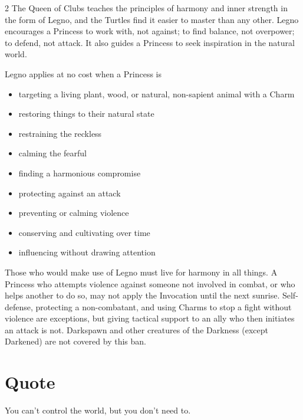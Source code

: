\begin{multicols}{2}
The Queen of Clubs teaches the principles of harmony and inner strength in the form of Legno, and the Turtles find it easier to master than any other. Legno encourages a Princess to work with, not against; to find balance, not overpower; to defend, not attack. It also guides a Princess to seek inspiration in the natural world.

Legno applies at no cost when a Princess is
\begin{itemize}
\item targeting a living plant, wood, or natural, non-sapient animal with a Charm
\item restoring things to their natural state
\item restraining the reckless
\item calming the fearful
\item finding a harmonious compromise
\item protecting against an attack
\item preventing or calming violence
\item conserving and cultivating over time
\item influencing without drawing attention
\end{itemize}

Those who would make use of Legno must live for harmony in all things. A Princess who attempts violence against someone not involved in combat, or who helps another to do so, may not apply the Invocation until the next sunrise. Self-defense, protecting a non-combatant, and using Charms to stop a fight without violence are exceptions, but giving tactical support to an ally who then initiates an attack is not. Darkspawn and other creatures of the Darkness (except Darkened) are not covered by this ban. 

\section*{Quote}

You can't control the world, but you don't need to.


\end{multicols}
